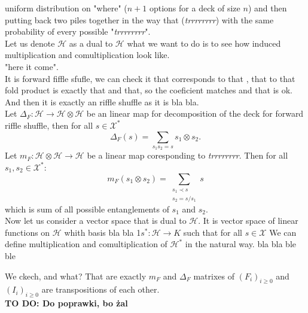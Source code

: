 \documentclass[a4paper, 12pt]{report}
\newcommand{\todo}[1]{\hfill \break \textbf{\Huge TO DO: #1 \hfill \break}\normalsize}
\begin{document}
uniform distribution on "where" ($n+1$ options for a deck of size $n$) and then putting back
two piles together in the way that 
(\textit{trrrrrrrr}) with
the same probability of every possible "\textit{trrrrrrrr}". \\
Let us denote $\mathcal{H}$ as a dual to $\mathcal{H}$ what we want to do is to see how induced
multiplication and comultiplication look like. \\
"here it come". \\
It is forward fiffle sfufle, we can check it
that corresponds to that , that to that
fold product is exactly that and that, so the coeficient matches and that is ok. \\
And then it is exactly an riffle shuffle as it is bla bla. \\
Let $\Delta_F : \mathcal{H} \to \mathcal{H} \otimes \mathcal{H}$ be an linear map for decomposition
of the deck for forward riffle shuffle, then for all $s \in \mathcal{X}^*$
\begin{equation*}
\Delta_F(s) = \sum_{s_1s_2=s} s_1 \otimes s_2.
\end{equation*}
Let $m_F : \mathcal{H} \otimes \mathcal{H} \to \mathcal{H}$ be a linear map coresponding to
\textit{trrrrrrrr}. Then for all $s_1, s_2 \in \mathcal{X}^*$:
\begin{equation*}
m_F (s_1 \otimes s_2) = \sum_{\substack{s_1 \prec s \\ s_2 = s/s_1} } s
\end{equation*}
which is sum of all possible entanglements of $s_1$ and $s_2$.\\[8pt]
Now let us consider a vector space that is dual to $\mathcal{H}$. It is vector space of linear functions on
$\mathcal{H}$
whith basis bla bla
1$s^* : \mathcal{H} \to K$ such that for all $s \in \mathcal{X }$
We can define multiplication and comultiplication of $\mathcal{H}^*$ in the natural way.
bla bla
ble ble

We ckech, and what? That are exactly $m_F$ and $\Delta_F$ matrixes of $(F_i)_{i \geq 0}$ and $(I_i)_{i
\geq 0}$
are transpositions of each other.\\
\todo{Do poprawki, bo żal}
\end{document}
